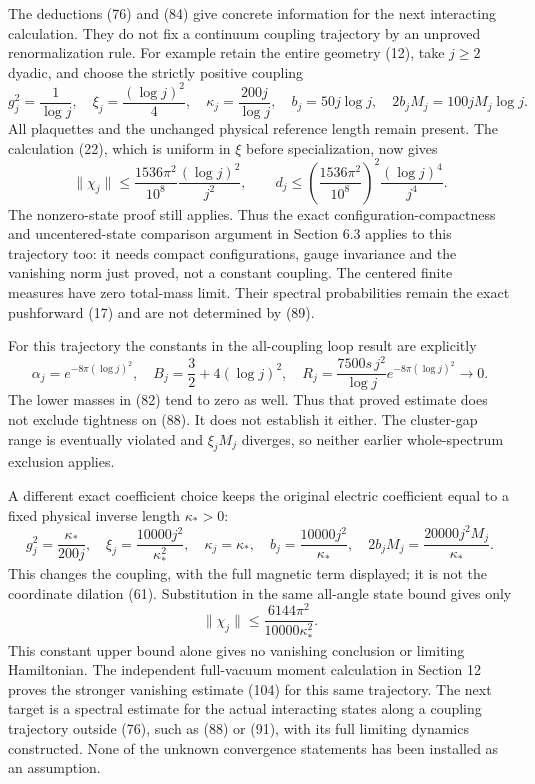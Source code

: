 \documentclass[
  11pt,
]{article}
\begin{document}
The deductions (76) and (84) give concrete information for the next
interacting calculation. They do not fix a continuum coupling trajectory
by an unproved renormalization rule. For example retain the entire
geometry (12), take \(j\ge2\) dyadic, and choose the strictly positive
coupling \[
 g_j^2=\frac1{\log j},\quad
 \xi_j=\frac{(\log j)^2}{4},\quad
 \kappa_j=\frac{200j}{\log j},\quad
 b_j=50j\log j,\quad
 2b_jM_j=100jM_j\log j .
 \tag{88}
\] All plaquettes and the unchanged physical reference length remain
present. The calculation (22), which is uniform in \(\xi\) before
specialization, now gives \[
 \|\chi_j\|\le
 \frac{1536\pi^2}{10^8}\frac{(\log j)^2}{j^2},\qquad
 d_j\le\left(\frac{1536\pi^2}{10^8}\right)^2
             \frac{(\log j)^4}{j^4}.
 \tag{89}
\] The nonzero-state proof still applies. Thus the exact
configuration-compactness and uncentered-state comparison argument in
Section 6.3 applies to this trajectory too: it needs compact
configurations, gauge invariance and the vanishing norm just proved, not
a constant coupling. The centered finite measures have zero total-mass
limit. Their spectral probabilities remain the exact pushforward (17)
and are not determined by (89).

For this trajectory the constants in the all-coupling loop result are
explicitly \[
 \alpha_j=e^{-8\pi(\log j)^2},\quad B_j=\frac32+4(\log j)^2,\quad
 R_j=\frac{7500s\,j^2}{\log j}e^{-8\pi(\log j)^2}\longrightarrow0 .
 \tag{90}
\] The lower masses in (82) tend to zero as well. Thus that proved
estimate does not exclude tightness on (88). It does not establish it
either. The cluster-gap range is eventually violated and \(\xi_jM_j\)
diverges, so neither earlier whole-spectrum exclusion applies.

A different exact coefficient choice keeps the original electric
coefficient equal to a fixed physical inverse length \(\kappa_*>0\): \[
 g_j^2=\frac{\kappa_*}{200j},\quad
 \xi_j=\frac{10000j^2}{\kappa_*^2},\quad
 \kappa_j=\kappa_*,\quad
 b_j=\frac{10000j^2}{\kappa_*},\quad
 2b_jM_j=\frac{20000j^2M_j}{\kappa_*}.
 \tag{91}
\] This changes the coupling, with the full magnetic term displayed; it
is not the coordinate dilation (61). Substitution in the same all-angle
state bound gives only \[
 \|\chi_j\|\le\frac{6144\pi^2}{10000\kappa_*^2}.
 \tag{92}
\] This constant upper bound alone gives no vanishing conclusion or
limiting Hamiltonian. The independent full-vacuum moment calculation in
Section 12 proves the stronger vanishing estimate (104) for this same
trajectory. The next target is a spectral estimate for the actual
interacting states along a coupling trajectory outside (76), such as
(88) or (91), with its full limiting dynamics constructed. None of the
unknown convergence statements has been installed as an assumption.
\end{document}
